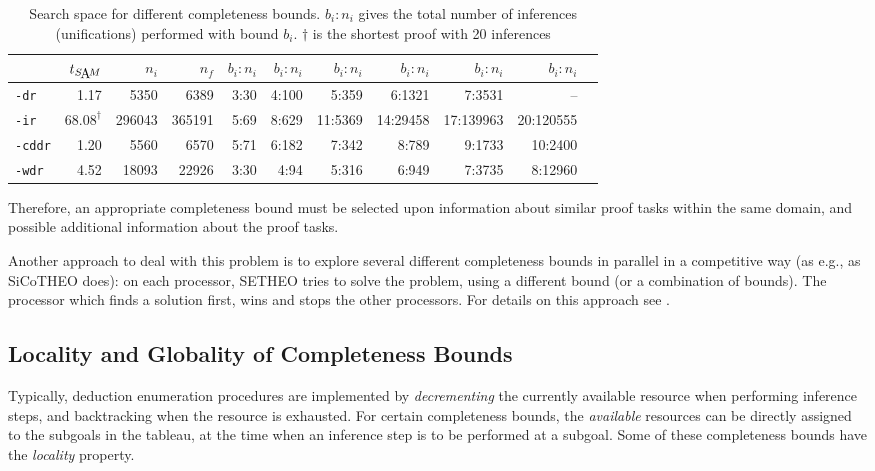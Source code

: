 \begin{table}[htb]
\begin{center}
\footnotesize
\begin{tabular}{|l|r|r|r||r|r|r|r|r|r|r|}
\hline
& $t_{\SAM}$ & $n_i$ & $n_f$ & 
	$b_i:n_i$ &
	$b_i:n_i$ &
	$b_i:n_i$ &
	$b_i:n_i$ &
	$b_i:n_i$ &
	$b_i:n_i$ \\
\hline\hline
{\tt -dr} & 1.17 & 5350 & 6389 &
	3:30 & 4:100 & 5:359 & 6:1321 & 7:3531 & --\\
\hline
{\tt -ir} & $68.08^\dagger$ & 296043 & 365191 &
	5:69 & 8:629 & 11:5369 & 14:29458 & 17:139963 & 20:120555  \\
\hline
{\tt -cddr} & 1.20 & 5560 & 6570 &
	5:71 & 6:182 & 7:342 & 8:789 &
	9:1733 & 10:2400 \\
\hline
{\tt -wdr} & 4.52 & 18093 & 22926 &
	3:30 & 4:94 & 5:316 & 6:949 &
	7:3735 & 8:12960 \\
\hline\hline
\end{tabular}
\end{center}
\caption{Search space for different completeness bounds. $b_i:n_i$ gives the 
	total number of inferences (unifications) performed with bound $b_i$.
	$\dagger$ is the shortest proof with 20 inferences}
\label{tab:tut2:bounds.results}
\end{table}

Therefore, an appropriate completeness bound must be selected upon information
about similar proof tasks within the same domain, and possible additional
information about the proof tasks.

Another approach to deal with this problem is to explore several different
completeness bounds in parallel in a competitive way (as e.g., as SiCoTHEO does):
on each processor, SETHEO tries to solve the problem, using a different
bound (or a combination of bounds). The processor which finds a solution
first, wins and stops the other processors.  
For details on this approach see \cite{Sch96ppai}.

\subsection{Locality and Globality of Completeness Bounds}

Typically, deduction enumeration procedures are implemented by 
{\em decrementing\/} the currently available resource when performing
inference steps, and backtracking when the resource is exhausted.  
For certain completeness bounds, the {\em available\/} resources can be 
directly assigned to the subgoals in the tableau, at the time when
an inference step is to be performed at a subgoal. 
Some of these completeness bounds have the {\em locality\/} property.

